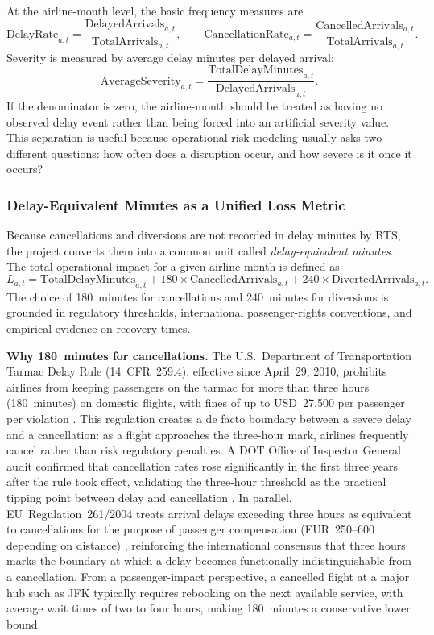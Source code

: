 \documentclass[11pt]{article}
\begin{document}
At the airline-month level, the basic frequency measures are
\[
\mathrm{DelayRate}_{a,t} =
\frac{\mathrm{DelayedArrivals}_{a,t}}{\mathrm{TotalArrivals}_{a,t}},
\qquad
\mathrm{CancellationRate}_{a,t} =
\frac{\mathrm{CancelledArrivals}_{a,t}}{\mathrm{TotalArrivals}_{a,t}}.
\]
Severity is measured by average delay minutes per delayed arrival:
\[
\mathrm{AverageSeverity}_{a,t} =
\frac{\mathrm{TotalDelayMinutes}_{a,t}}{\mathrm{DelayedArrivals}_{a,t}}.
\]
If the denominator is zero, the airline-month should be treated as having no observed delay event rather than being forced into an artificial severity value. This separation is useful because operational risk modeling usually asks two different questions: how often does a disruption occur, and how severe is it once it occurs?

\subsubsection*{Delay-Equivalent Minutes as a Unified Loss Metric}
Because cancellations and diversions are not recorded in delay minutes by BTS, the project converts them into a common unit called \emph{delay-equivalent minutes}. The total operational impact for a given airline-month is defined as
\[
L_{a,t} = \mathrm{TotalDelayMinutes}_{a,t}
         + 180 \times \mathrm{CancelledArrivals}_{a,t}
         + 240 \times \mathrm{DivertedArrivals}_{a,t}.
\]
The choice of 180~minutes for cancellations and 240~minutes for diversions is grounded in regulatory thresholds, international passenger-rights conventions, and empirical evidence on recovery times.

\textbf{Why 180~minutes for cancellations.}
The U.S.\ Department of Transportation Tarmac Delay Rule (14~CFR~259.4), effective since April~29, 2010, prohibits airlines from keeping passengers on the tarmac for more than three hours (180~minutes) on domestic flights, with fines of up to USD~27,500 per passenger per violation \cite{dot2010tarmac}. This regulation creates a de facto boundary between a severe delay and a cancellation: as a flight approaches the three-hour mark, airlines frequently cancel rather than risk regulatory penalties. A DOT Office of Inspector General audit confirmed that cancellation rates rose significantly in the first three years after the rule took effect, validating the three-hour threshold as the practical tipping point between delay and cancellation \cite{dotoig2014tdr}. In parallel, EU~Regulation~261/2004 treats arrival delays exceeding three hours as equivalent to cancellations for the purpose of passenger compensation (EUR~250--600 depending on distance) \cite{eu261}, reinforcing the international consensus that three hours marks the boundary at which a delay becomes functionally indistinguishable from a cancellation. From a passenger-impact perspective, a cancelled flight at a major hub such as JFK typically requires rebooking on the next available service, with average wait times of two to four hours, making 180~minutes a conservative lower bound.
\end{document}
